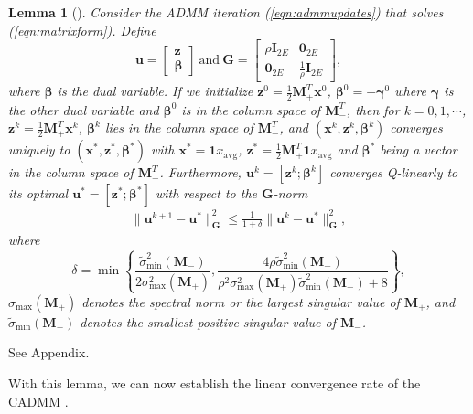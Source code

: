 \documentclass[journal]{IEEEtran}
\newtheorem{lemma}{Lemma}
\begin{document}
\begin{lemma}[{\cite[Theorem 1]{Shi2014}}]
\label{lem:linearconvergence} 
Consider the ADMM iteration (\ref{eqn:admmupdates}) that solves (\ref{eqn:matrixform}). Define $$\bm u = \left[\begin{array}{c} \bm z\\\bm \beta \end{array} \right]~\text{and}~\bm G = \begin{bmatrix} \rho \bm I_{2E} & \bm 0_{2E} \\ \bm 0_{2E}& \frac{1}{\rho}\bm I_{2E}  \end{bmatrix},$$where $\bm\beta$ is the dual variable. If we initialize $\bm z^0=\frac{1}{2}\bm M_+^T\bm x^0$, $\bm \beta^0=-\bm\gamma^0$ where $\bm\gamma$ is the other dual variable and $\bm\beta^0$ is in the column space of $\bm M_-^T$, then for $k=0,1,\cdots$, $\bm z^k=\frac{1}{2}\bm M_+^T\bm x^k$, $\bm\beta^k$ lies in the column space of $\bm M_-^T$, and $(\bm x^k,\bm z^k,\bm\beta^k)$ converges uniquely to $(\bm x^*,\bm z^*,\bm \beta^*)$ with $\bm x^*=\bm 1x_\text{avg}$, $\bm z^*=\frac{1}{2}\bm M_+^T\bm 1x_{\text{avg}}$ and $\bm\beta^*$ being a vector in the column space of $\bm M_-^T$. Furthermore, $\bm u^k = [\bm z^k;\bm\beta^k]$ converges Q-linearly to its optimal $\bm u^*=[\bm z^*;\bm\beta^*]$ with respect to the $\bm G$-norm
\begin{equation}
\label{eqn:Ulinearconvergence}
\begin{aligned}
\|\bm u^{k+1}-\bm u^*\|_{\bm G}^2\leq\frac{1}{1+\delta}\|\bm u^k-\bm u^*\|_{\bm G}^2,
\end{aligned}
\end{equation}
where $$\delta = \min\left\{\frac{{\tilde{\sigma}}_{\min}^2(\bm M_-)}{2\sigma_{\max}^2(\bm M_+)}, \frac{4\rho{\tilde{\sigma}}_{\min}^2(\bm M_-)}{\rho^2\sigma_{\max}^2(\bm M_+){\tilde{\sigma}}_{\min}^2(\bm M_-)+ 8}\right\},$$
${\sigma_{\max}}(\bm M_+)$ denotes the spectral norm or the largest singular value of $\bm M_+$, and $\tilde{\sigma}_{\min}(\bm M_-)$ denotes the smallest positive singular value of $\bm M_-$.
\end{lemma}
\begin{IEEEproof}
See Appendix.
\end{IEEEproof}

With this lemma, we can now establish the linear convergence rate of the CADMM .
\end{document}
